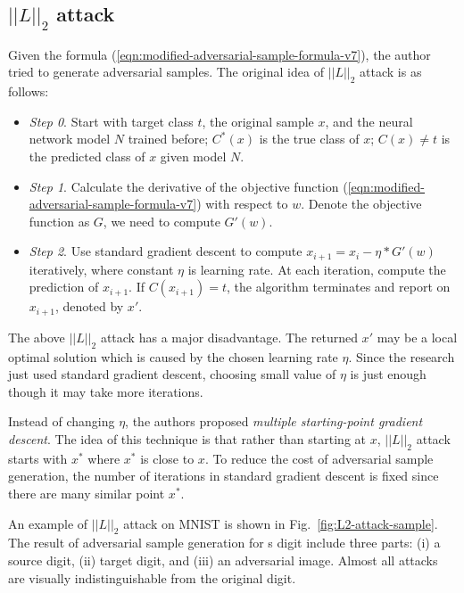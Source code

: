 \documentclass[12pt]{article}
\begin{document}
\subsection{$||L||_2$ attack}

Given the formula (\ref{eqn:modified-adversarial-sample-formula-v7}), the author tried to  generate adversarial samples. The original idea of  $||L||_2$ attack is as follows:

\begin{itemize}
	\item \textit{Step 0}. Start with target class $t$, the original sample $x$, and the neural network model $N$ trained before; $C^*(x) $ is the true class of $x$; $C(x) \ne t$ is the predicted class of $x$ given model $N$.
	
	\item \textit{Step 1}. Calculate the derivative of the objective function (\ref{eqn:modified-adversarial-sample-formula-v7}) with respect to $w$. Denote the objective function  as $G$, we need to compute $G'(w)$.
	
	\item \textit{Step 2}. Use standard gradient descent to compute $x_{i+1} = x_i - \eta * G'(w)$ iteratively, where constant $\eta$ is learning rate. At each iteration, compute the prediction of $x_{i+1}$. If $C(x_{i+1}) = t$, the algorithm terminates and report on $x_{i+1}$, denoted by $x'$.
	
	
\end{itemize}

The above $||L||_2$ attack has a major disadvantage. The returned $x'$ may be a local optimal solution which is caused by the chosen learning rate $\eta$. Since the research just used standard gradient descent, choosing small value of $\eta$ is just enough though it may take more iterations.

Instead of changing $\eta$, the authors proposed \textit{multiple starting-point gradient descent}. The idea of this technique is that rather than starting at $x$, $||L||_2$ attack starts with $x^* $ where $x^*$ is close to $x$. To reduce the cost of adversarial sample generation, the number of iterations in standard gradient descent is fixed since there are many similar point $x^*$.



An example of $||L||_2$ attack on MNIST is shown in Fig.~\ref{fig:L2-attack-sample}. The result of adversarial sample generation for s digit include three parts: (i) a source digit, (ii) target digit, and (iii) an adversarial image. Almost all attacks are visually indistinguishable from the original digit.
\end{document}
